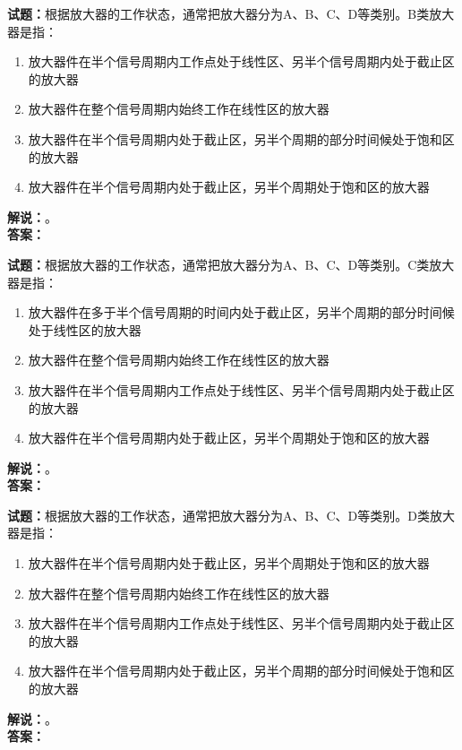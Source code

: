 \documentclass{ctexbook}
\begin{document}
\noindent\textbf{试题：}根据放大器的工作状态，通常把放大器分为A、B、C、D等类别。B类放大器是指：
\begin{enumerate}[leftmargin=3em]
\item 放大器件在半个信号周期内工作点处于线性区、另半个信号周期内处于截止区的放大器
\item 放大器件在整个信号周期内始终工作在线性区的放大器
\item 放大器件在半个信号周期内处于截止区，另半个周期的部分时间候处于饱和区的放大器
\item 放大器件在半个信号周期内处于截止区，另半个周期处于饱和区的放大器
\end{enumerate}
\noindent\textbf{解说：}\textbf{}。\\\noindent\textbf{答案：}

\bigskip




\noindent\textbf{试题：}根据放大器的工作状态，通常把放大器分为A、B、C、D等类别。C类放大器是指：
\begin{enumerate}[leftmargin=3em]
\item 放大器件在多于半个信号周期的时间内处于截止区，另半个周期的部分时间候处于线性区的放大器
\item 放大器件在整个信号周期内始终工作在线性区的放大器
\item 放大器件在半个信号周期内工作点处于线性区、另半个信号周期内处于截止区的放大器
\item 放大器件在半个信号周期内处于截止区，另半个周期处于饱和区的放大器
\end{enumerate}
\noindent\textbf{解说：}\textbf{}。\\\noindent\textbf{答案：}

\bigskip




\noindent\textbf{试题：}根据放大器的工作状态，通常把放大器分为A、B、C、D等类别。D类放大器是指：
\begin{enumerate}[leftmargin=3em]
\item 放大器件在半个信号周期内处于截止区，另半个周期处于饱和区的放大器
\item 放大器件在整个信号周期内始终工作在线性区的放大器
\item 放大器件在半个信号周期内工作点处于线性区、另半个信号周期内处于截止区的放大器
\item 放大器件在半个信号周期内处于截止区，另半个周期的部分时间候处于饱和区的放大器
\end{enumerate}
\noindent\textbf{解说：}\textbf{}。\\\noindent\textbf{答案：}
\end{document}
